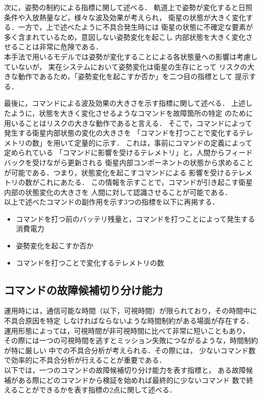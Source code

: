 \documentclass[11pt]{jsreport}
\begin{document}
次に，姿勢の制約による指標に関して述べる．
軌道上で姿勢が変化すると日照条件や入放熱量など，様々な波及効果が考えられ，
衛星の状態が大きく変化する．一方で，上で述べたように不具合発生時には
衛星の状態に不確定な要素が多く含まれているため，意図しない姿勢変化を起こし
内部状態を大きく変化させることは非常に危険である．\\
本手法で用いるモデルでは姿勢が変化することによる各状態量への影響は考慮していないが，
実在システムにおいて姿勢変化は衛星の生存にとって
リスクの大きな動作であるため，「姿勢変化を起こすか否か」を二つ目の指標として
提示する．

最後に，コマンドによる波及効果の大きさを示す指標に関して述べる．
上述したように，状態を大きく変化させるようなコマンドを故障箇所の特定
のために用いることはリスクの大きな動作であると言える．
そこで，コマンドによって発生する衛星内部状態の変化の大きさを
「コマンドを打つことで変化するテレメトリの数」を用いて定量的に示す．
これは，事前にコマンドの定義によって定められている
「コマンドに影響を受けるテレメトリ」と，人間からフィードバックを受けながら更新される
衛星内部コンポーネントの状態から求めることが可能である．つまり，状態変化を起こすコマンドによる
影響を受けるテレメトリの数がこれにあたる．
この情報を示すことで，コマンドが引き起こす衛星内部の状態変化の大きさを
人間に対して認識させることが可能である．\\
以上で述べたコマンドの副作用を示す3つの指標を以下に再掲する．
\begin{itemize}
   \item コマンドを打つ前のバッテリ残量と，コマンドを打つことによって発生する消費電力
   \item 姿勢変化を起こすか否か
   \item コマンドを打つことで変化するテレメトリの数
\end{itemize}

\subsection{コマンドの故障候補切り分け能力}
運用時には，通信可能な時間（以下，可視時間）が限られており，その時間中に不具合原因を特定
しなければならないような時間制約がある場面が存在する．
運用形態によっては，可視時間が非可視時間に比べて非常に短いこともあり，
その際には一つの可視時間を逃すとミッション失敗につながるような，時間制約が特に厳しい
中での不具合分析が考えられる．その際には，
少ないコマンド数で効率的に不具合分析が行えることが重要である．\\
以下では，一つのコマンドの故障候補切り分け能力を表す指標と，
ある故障候補がある際にどのコマンドから検証を始めれば最終的に少ないコマンド
数で終えることができるかを表す指標の2点に関して述べる．
\end{document}
